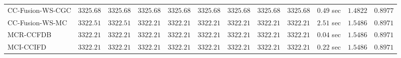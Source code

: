 \begin{table}[H]
\begin{tabular}{lrrrrrrrrrrr}
    CC-Fusion-WS-CGC & $      3325.68$ & $      3325.68$ & $      3325.68$ & $      3325.68$ & $      3325.68$ & $      3325.68$ & $      3325.68$ & $      3325.68$ & $         0.49$ sec    & $       1.4822$  & $       0.8977$ \\ 
     CC-Fusion-WS-MC & $      3322.51$ & $      3322.51$ & $      3322.21$ & $      3322.21$ & $      3322.21$ & $      3322.21$ & $      3322.21$ & $      3322.21$ & $         2.51$ sec    & $       1.5486$  & $       0.8971$ \\ 
\cmidrule{1-1} 
           MCR-CCFDB & $      3322.21$ & $      3322.21$ & $      3322.21$ & $      3322.21$ & $      3322.21$ & $      3322.21$ & $      3322.21$ & $      3322.21$ & $         0.04$ sec    & $       1.5486$  & $       0.8971$ \\ 
\cmidrule{1-1} 
           MCI-CCIFD & $      3322.21$ & $      3322.21$ & $      3322.21$ & $      3322.21$ & $      3322.21$ & $      3322.21$ & $      3322.21$ & $      3322.21$ & $         0.22$ sec    & $       1.5486$  & $       0.8971$ \\ 
\bottomrule
\end{tabular}
\end{table}

